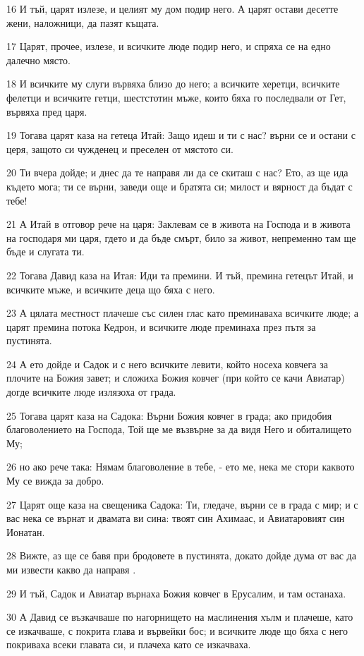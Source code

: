 \par 16 И тъй, царят излезе, и целият му дом подир него. А царят остави десетте жени, наложници, да пазят къщата.
\par 17 Царят, прочее, излезе, и всичките люде подир него, и спряха се на едно далечно място.
\par 18 И всичките му слуги вървяха близо до него; а всичките херетци, всичките фелетци и всичките гетци, шестстотин мъже, които бяха го последвали от Гет, вървяха пред царя.
\par 19 Тогава царят каза на гетеца Итай: Защо идеш и ти с нас? върни се и остани с церя, защото си чужденец и преселен от мястото си.
\par 20 Ти вчера дойде; и днес да те направя ли да се скиташ с нас? Ето, аз ще ида където мога; ти се върни, заведи още и братята си; милост и вярност да бъдат с тебе!
\par 21 А Итай в отговор рече на царя: Заклевам се в живота на Господа и в живота на господаря ми царя, гдето и да бъде смърт, било за живот, непременно там ще бъде и слугата ти.
\par 22 Тогава Давид каза на Итая: Иди та премини. И тъй, премина гетецът Итай, и всичките мъже, и всичките деца що бяха с него.
\par 23 А цялата местност плачеше със силен глас като преминаваха всичките люде; а царят премина потока Кедрон, и всичките люде преминаха през пътя за пустинята.
\par 24 А ето дойде и Садок и с него всичките левити, който носеха ковчега за плочите на Божия завет; и сложиха Божия ковчег (при който се качи Авиатар) догде всичките люде излязоха от града.
\par 25 Тогава царят каза на Садока: Върни Божия ковчег в града; ако придобия благоволението на Господа, Той ще ме възвърне за да видя Него и обиталището Му;
\par 26 но ако рече така: Нямам благоволение в тебе, - ето ме, нека ме стори каквото Му се вижда за добро.
\par 27 Царят още каза на свещеника Садока: Ти, гледаче, върни се в града с мир; и с вас нека се върнат и двамата ви сина: твоят син Ахимаас, и Авиатаровият син Ионатан.
\par 28 Вижте, аз ще се бавя при бродовете в пустинята, докато дойде дума от вас да ми извести какво да направя .
\par 29 И тъй, Садок и Авиатар върнаха Божия ковчег в Ерусалим, и там останаха.
\par 30 А Давид се възкачваше по нагорнището на маслинения хълм и плачеше, като се изкачваше, с покрита глава и вървейки бос; и всичките люде що бяха с него покриваха всеки главата си, и плачеха като се изкачваха.
